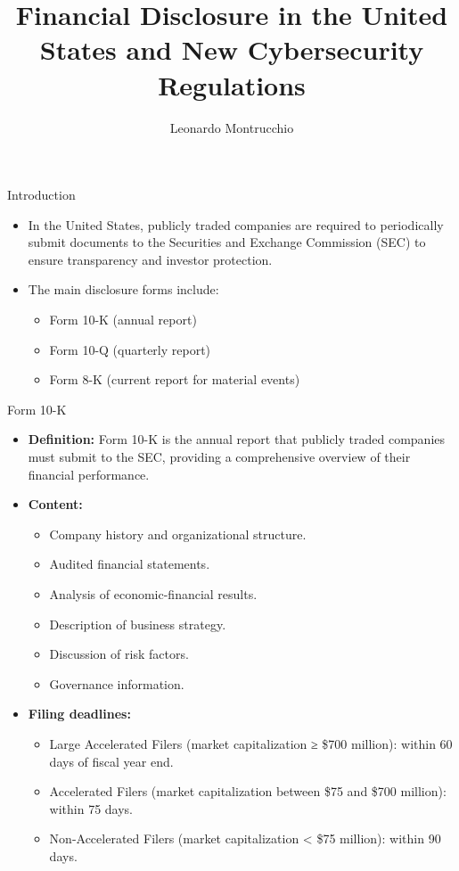 \documentclass{beamer}
\title{Financial Disclosure in the United States and New Cybersecurity Regulations}
\author{Leonardo Montrucchio}
\date{}
\begin{document}
\begin{frame}
\titlepage
\end{frame}

\begin{frame}{Introduction}
\begin{itemize}
\item In the United States, publicly traded companies are required to periodically submit documents to the Securities and Exchange Commission (SEC) to ensure transparency and investor protection.
\item The main disclosure forms include:
\begin{itemize}
\item Form 10-K (annual report)
\item Form 10-Q (quarterly report)
\item Form 8-K (current report for material events)
\end{itemize}
\end{itemize}
\end{frame}

\begin{frame}{Form 10-K}
\begin{itemize}
\item \textbf{Definition:} Form 10-K is the annual report that publicly traded companies must submit to the SEC, providing a comprehensive overview of their financial performance.
\item \textbf{Content:}
\begin{itemize}
\item Company history and organizational structure.
\item Audited financial statements.
\item Analysis of economic-financial results.
\item Description of business strategy.
\item Discussion of risk factors.
\item Governance information.
\end{itemize}
\item \textbf{Filing deadlines:}
\begin{itemize}
\item Large Accelerated Filers (market capitalization ≥ \$700 million): within 60 days of fiscal year end.
\item Accelerated Filers (market capitalization between \$75 and \$700 million): within 75 days.
\item Non-Accelerated Filers (market capitalization < \$75 million): within 90 days.
\end{itemize}
\end{itemize}
\end{frame}
\end{document}
